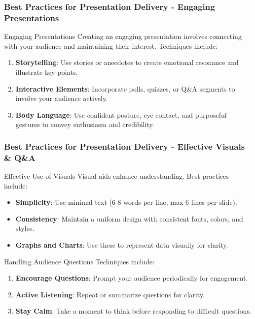 \documentclass[aspectratio=169]{beamer}
\begin{document}
\begin{frame}[fragile]
    \frametitle{Best Practices for Presentation Delivery - Engaging Presentations}
    \begin{block}{Engaging Presentations}
    Creating an engaging presentation involves connecting with your audience and maintaining their interest. Techniques include:
    \end{block}
    \begin{enumerate}
        \item \textbf{Storytelling}: Use stories or anecdotes to create emotional resonance and illustrate key points.
        \item \textbf{Interactive Elements}: Incorporate polls, quizzes, or Q\&A segments to involve your audience actively.
        \item \textbf{Body Language}: Use confident posture, eye contact, and purposeful gestures to convey enthusiasm and credibility. 
    \end{enumerate}
\end{frame}

\begin{frame}[fragile]
    \frametitle{Best Practices for Presentation Delivery - Effective Visuals \& Q\&A}
    \begin{block}{Effective Use of Visuals}
    Visual aids enhance understanding. Best practices include:
    \end{block}
    \begin{itemize}
        \item \textbf{Simplicity}: Use minimal text (6-8 words per line, max 6 lines per slide). 
        \item \textbf{Consistency}: Maintain a uniform design with consistent fonts, colors, and styles.
        \item \textbf{Graphs and Charts}: Use these to represent data visually for clarity.
    \end{itemize}
    
    \begin{block}{Handling Audience Questions}
    Techniques include:
    \end{block}
    \begin{enumerate}
        \item \textbf{Encourage Questions}: Prompt your audience periodically for engagement.
        \item \textbf{Active Listening}: Repeat or summarize questions for clarity.
        \item \textbf{Stay Calm}: Take a moment to think before responding to difficult questions.
    \end{enumerate}
\end{frame}
\end{document}
